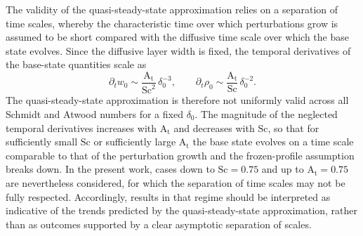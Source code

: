 \documentclass[11pt]{article}
\newcommand{\Atw}{\mathrm{A_t}}
\newcommand{\Sch}{\mathrm{Sc}}
\begin{document}
The validity of the quasi-steady-state approximation relies on a separation of time scales, whereby the characteristic time over which perturbations grow is assumed to be short compared with the diffusive time scale over which the base state evolves. Since the diffusive layer width is fixed, the temporal derivatives of the base-state quantities scale as
\begin{equation}
    \partial_t w_0 \sim \frac{\Atw}{\Sch^{2}}\,\delta_0^{-3}, \qquad \partial_t \rho_0 \sim \frac{\Atw}{\Sch}\,\delta_0^{-2}.
    \label{eq:estimation_qssa_failure}
\end{equation}
The quasi-steady-state approximation is therefore not uniformly valid across all Schmidt and Atwood numbers for a fixed \(\delta_0\). The magnitude of the neglected temporal derivatives increases with \(\Atw\) and decreases with \(\Sch\), so that for sufficiently small \(\Sch\) or sufficiently large \(\Atw\) the base state evolves on a time scale comparable to that of the perturbation growth and the frozen-profile assumption breaks down. In the present work, cases down to \(\Sch = 0.75\) and up to \(\Atw = 0.75\) are nevertheless considered, for which the separation of time scales may not be fully respected. Accordingly, results in that regime should be interpreted as indicative of the trends predicted by the quasi-steady-state approximation, rather than as outcomes supported by a clear asymptotic separation of scales.
\end{document}

